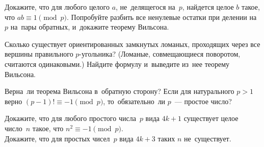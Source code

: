 \begin{problems}

\item
Докажите, что для любого целого $a$, не~делящегося на~$p$, найдется целое $b$
такое, что $a b \equiv 1 \pmod p$.
Попробуйте разбить все ненулевые остатки при делении на~$p$ на~пары обратных,
и~докажите теорему Вильсона.

\item
Сколько существует ориентированных замкнутых ломаных, проходящих через все
вершины правильного $p$-угольника?
(Ломаные, совмещающиеся поворотом, считаются одинаковыми.)
Найдите формулу и~выведите из~нее теорему Вильсона.

\item
Верна~ли теорема Вильсона в~обратную сторону?
Если для натурального $p > 1$ верно $(p - 1)! \equiv -1 \pmod p$,
то~обязательно~ли $p$~--- простое число?




\item
\subproblem
Докажите, что для любого простого числа~$p$ вида $4 k + 1$ существует целое
число~$n$ такое, что $n^2 \equiv -1 \pmod p$.
\\
\subproblem
Докажите, что для простых чисел~$p$ вида $4 k + 3$ таких $n$ не~существует.


\end{problems}

\endgroup %

